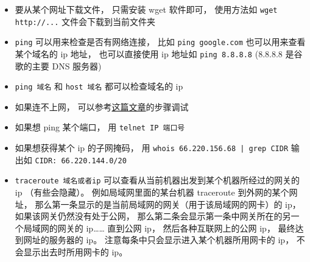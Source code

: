 \begin{itemize}
\item 要从某个网址下载文件， 只需安装 wget 软件即可， 使用方法如 \verb`wget http://...` 文件会下载到当前文件夹
\item \verb`ping` 可以用来检查是否有网络连接， 比如 \verb`ping google.com` 也可以用来查看某个域名的 ip 地址， 也可以直接使用 ip 地址如 \verb`ping 8.8.8.8` (8.8.8.8 是谷歌的主要 DNS 服务器)
\item \verb`ping 域名` 和 \verb|host 域名| 都可以检查域名的 ip
\item 如果连不上网， 可以参考\href{https://upcloud.com/community/tutorials/troubleshoot-network-connectivity-linux-server/}{这篇文章}的步骤调试
\item 如果想 ping 某个端口， 用 \verb|telnet IP 端口号|
\item 如果想获得某个 ip 的子网掩码， 用 \verb`whois 66.220.156.68 | grep CIDR` 输出如 \verb|CIDR: 66.220.144.0/20|
\item \verb|traceroute 域名或者ip| 可以查看从当前机器出发到某个机器所经过的网关的 ip （有些会隐藏）。 例如局域网里面的某台机器 traceroute 到外网的某个网址， 那么第一条显示的是当前局域网的网关（用于该局域网的网卡）的 ip， 如果该网关仍然没有处于公网， 那么第二条会显示第一条中网关所在的另一个局域网的网关的 ip…… 直到公网 ip， 然后各种互联网上的公网 ip， 最终达到网址的服务器的 ip。 注意每条中只会显示进入某个机器所用网卡的 ip， 不会显示出去时所用网卡的 ip。
\end{itemize}

